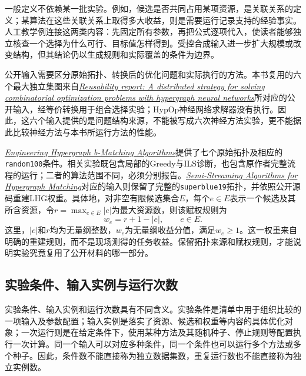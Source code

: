 一般定义不依赖某一批实验。例如，候选是否共同占用某项资源，是关联关系的定义；某算法在这些关联关系上取得多大收益，则是需要运行记录支持的经验事实。人工教学例连接这两类内容：先固定所有参数，再把公式逐项代入，使读者能够独立核查一个选择为什么可行、目标值怎样得到。受控合成输入进一步扩大规模或改变结构，但其结论仍以生成规则和实际覆盖的条件为边界。

公开输入需要区分原始拓扑、转换后的优化问题和实际执行的方法。本书复用的六个最大独立集图来自\href{https://doi.org/10.1038/s42256-025-01141-4}{\textit{Reusability report: A distributed strategy for solving combinatorial optimization problems with hypergraph neural networks}}所对应的公开输入，经等价转换用于组合选择实验；HypOp神经网络求解器没有执行。因此，这六个输入提供的是问题结构来源，不能被写成六次神经方法实验，更不能据此比较神经方法与本书所运行方法的性能。

\href{https://doi.org/10.7155/jgaa.v30i1.3166}{\textit{Engineering Hypergraph b-Matching Algorithms}}提供了七个原始拓扑及相应的\texttt{random100}条件。相关实验既包含局部的Greedy与ILS诊断，也包含原作者完整流程的运行；二者的算法范围不同，必须分别报告。\href{https://doi.org/10.4230/LIPIcs.ESA.2025.79}{\textit{Semi-Streaming Algorithms for Hypergraph Matching}}对应的输入则保留了完整的\texttt{superblue19}拓扑，并依照公开源码重建LHG权重。具体地，对非空有限候选集合$E$，每个$e\in E$表示一个候选及其所含资源，令$r=\max_{e\in E}|e|$为最大资源数，则该赋权规则为
\begin{equation}
 w_e=r+1-|e|,\qquad e\in E.
 \label{s0104:public_weight}
\end{equation}
这里，$|e|$和$r$均为无量纲整数，$w_e$为无量纲收益分值，满足$w_e\geq1$。这一权重来自明确的重建规则，而不是现场测得的任务收益。保留拓扑来源和赋权规则，才能说明实验究竟复用了公开材料的哪一部分。

\subsection{实验条件、输入实例与运行次数}

实验条件、输入实例和运行次数具有不同含义。实验条件是清单中用于组织比较的一项输入及参数配置；输入实例是落实了资源、候选和权重等内容的具体优化对象；一次运行则是在给定条件下，使用某种方法及其随机种子、停止规则等配置执行一次计算。同一个输入可以对应多种条件，同一个条件也可以运行多个方法或多个种子。因此，条件数不能直接称为独立数据集数，重复运行数也不能直接称为独立实例数。

